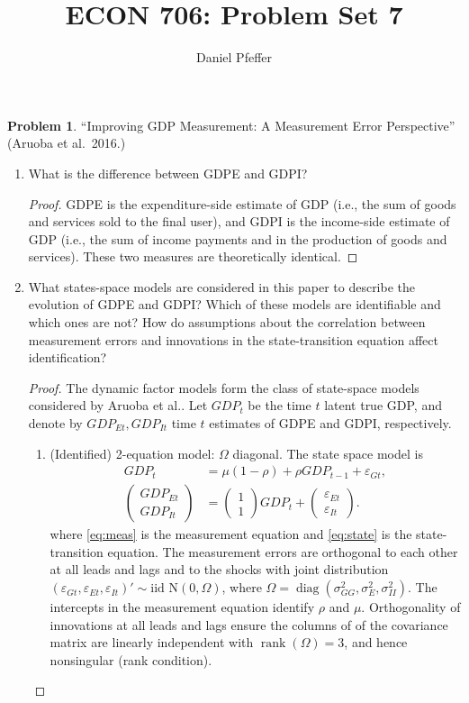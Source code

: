 \documentclass[oneside,reqno]{amsart}
\title{ECON 706: Problem Set 7}
\author{Daniel Pfeffer}
\DeclareMathOperator{\diag}{diag}
\DeclareMathOperator{\rank}{rank}
\newcommand{\eps}{\varepsilon}
\newcommand{\N}{\mathrm N}
\theoremstyle{definition}
\newtheorem{prob}{Problem}
\begin{document}
\maketitle

\begin{prob}
``Improving GDP Measurement: A Measurement Error Perspective'' (Aruoba et al.\ 2016.)
\end{prob}

\begin{enumerate}[label=(\roman*)]
\item
What is the difference between GDPE and GDPI?
\begin{proof}
GDPE is the expenditure-side estimate of GDP  (i.e., the sum of goods and services sold to the final user), and GDPI is the income-side estimate of GDP (i.e., the sum of income payments and  in the production of goods and services). These two measures are theoretically identical.
\end{proof}
\item
What states-space models are considered in this paper to describe the
evolution of GDPE and GDPI? Which of these models are identifiable and which ones are not? How do assumptions about the correlation between measurement errors and innovations in the state-transition equation affect identification?
\begin{proof}
The dynamic factor models form the class of state-space models considered by Aruoba et al.. Let $GDP_t$ be the time $t$ latent true GDP, and denote by $GDP_{Et}, GDP_{It}$ time $t$ estimates of GDPE and GDPI, respectively.  
\leavevmode
\begin{enumerate}[label=(\arabic*)]
\item
(Identified) 2-equation model: $\Omega$ diagonal. The state space model is 
\begin{align}
	GDP_t &= \mu(1-\rho) + \rho GDP_{t-1} + \eps_{Gt}, \label{eq:state} \\
	\begin{pmatrix}
		GDP_{Et}  \\ GDP_{It}
	\end{pmatrix} 
	&= \begin{pmatrix}
		1 \\ 1
	\end{pmatrix} GDP_t
	+ \begin{pmatrix}
		\eps_{Et} \\ \eps_{It}
	\end{pmatrix}  \label{eq:meas}.
\end{align}
where \eqref{eq:meas} is the measurement equation and \eqref{eq:state} is the state-transition equation. The measurement errors are orthogonal to each other at all leads and lags and to the shocks with joint distribution $(\eps_{Gt}, \eps_{Et}, \eps_{It})' \sim \text{iid } \N(0, \Omega)$, where $\Omega = \diag(\sigma_{GG}^2, \sigma_E^2, \sigma_{II}^2)$. The intercepts in the measurement equation identify $\rho$ and $\mu$. Orthogonality of innovations at all leads and lags ensure the columns of of the covariance matrix are linearly independent with $\rank(\Omega) = 3$, and hence nonsingular (rank condition).

\end{enumerate}
\end{proof}
\end{enumerate}
\end{document}
